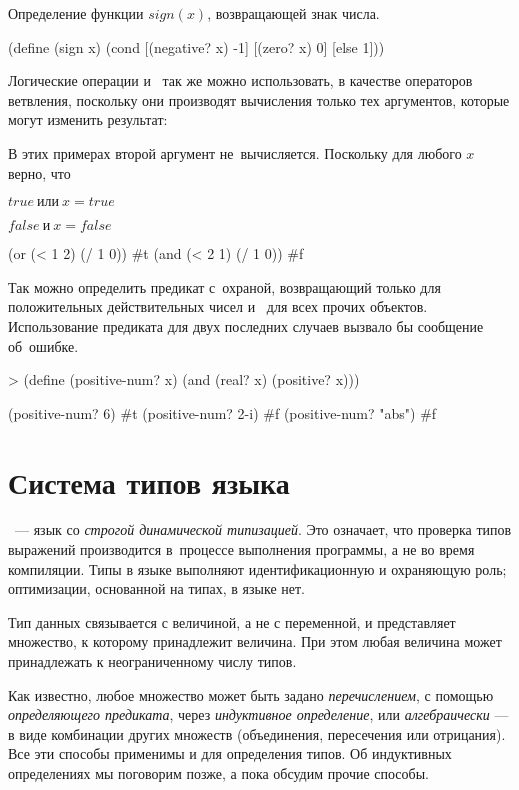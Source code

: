 \begin{example}{\label{example:sign}Определение функции $sign(x)$, возвращающей знак числа.}
\begin{ExampleCode}
(define (sign x)
  (cond
    [(negative? x) -1]
    [(zero? x) 0]
    [else 1]))
\end{ExampleCode}
\end{example}

Логические операции  и~ так же можно использовать, в качестве операторов ветвления, поскольку они производят вычисления только тех аргументов, которые могут изменить результат:

\begin{example}{%
В этих примерах второй аргумент не~вычисляется. Поскольку для любого $x$ верно, что

$true\ \text{или}\ x = true$

$false\ \text{и}\ x = false$}
\REPL
  {(or (< 1 2) (/ 1 0))}
  {\#t}
\REPL
  {(and (< 2 1) (/ 1 0))}
  {\#f}
\end{example}

\begin{example}{Так можно определить предикат с~охраной, возвращающий  только для положительных действительных чисел и~ для всех прочих объектов. Использование предиката  для двух последних случаев вызвало бы сообщение об~ошибке.}
\begin{ExampleCode}
> (define (positive-num? x)
    (and (real? x)
         (positive? x)))
\end{ExampleCode}
\REPL
  {(positive-num? 6)}
  {\#t}
\REPL
  {(positive-num? 2-i)}
  {\#f}
\REPL
  {(positive-num? "abs")}
  {\#f}
\end{example}

\section{Система типов языка \Scheme}%
\Scheme~--- язык со \emph{строгой динамической типизацией}. Это означает, что проверка типов выражений производится в~процессе выполнения программы, а не во время компиляции. Типы в языке выполняют идентификационную и охраняющую роль; оптимизации, основанной на типах, в языке нет.

Тип данных связывается с величиной, а не с переменной, и представляет множество, к которому принадлежит величина. При этом любая величина может принадлежать к неограниченному числу типов.

\label{set-definition}Как известно, любое множество может быть задано \emph{перечислением}, с помощью \emph{определяющего предиката}, через \emph{индуктивное определение}, или \emph{алгебраически} --- в виде комбинации других множеств (объединения, пересечения или отрицания). Все эти способы применимы и для определения типов. Об индуктивных определениях мы поговорим позже, а пока обсудим прочие способы.

